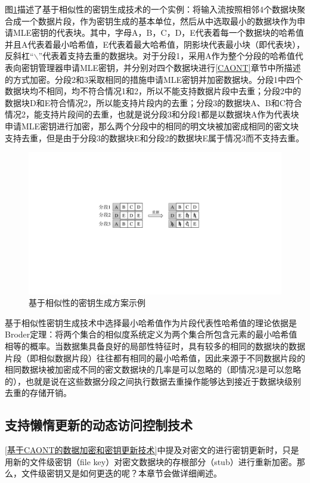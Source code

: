 \documentclass[promaster]{thesis-uestc}
\begin{document}
图\ref{基于相似性的密钥生成方案示例}描述了基于相似性的密钥生成技术的一个实例：将输入流按照相邻4个数据块聚合成一个数据片段，作为密钥生成的基本单位，然后从中选取最小的数据块作为申请MLE密钥的代表块。其中，字母A，B，C，D，E代表着每一个数据块的哈希值并且A代表着最小哈希值，E代表着最大哈希值，阴影块代表最小块（即代表块），反斜杠“$\backslash$”代表着支持去重的数据块。对于分段1，采用A作为整个分段的哈希值代表向密钥管理器申请MLE密钥，并分别对四个数据块进行\ref{CAONT}章节中所描述的方式加密。分段2和3采取相同的措施申请MLE密钥并加密数据块。分段1中四个数据块均不相同，均不符合情况1和2，所以不能支持数据片段中去重；分段2中的数据块D和E符合情况2，所以能支持片段内的去重；分段3的数据块A、B和C符合情况2，能支持片段间的去重，也就是说分段3和分段1都是以数据块A作为代表块申请MLE密钥进行加密，那么两个分段中的相同的明文块被加密成相同的密文块支持去重，但是由于分段3的数据块E和分段2的数据块E属于情况3而不支持去重。
\begin{figure}[htbp]
    \centering
    \includegraphics[width = 0.6\linewidth]{pic/相似性密钥生成方案.pdf}
    \caption{基于相似性的密钥生成方案示例}
    \label{基于相似性的密钥生成方案示例}
\end{figure}

基于相似性密钥生成技术中选择最小哈希值作为片段代表性哈希值的理论依据是Broder定理：将两个集合的相似度系统定义为两个集合所包含元素的最小哈希值相等的概率。当数据集具备良好的局部性特征时，具有较多的相同的数据块的数据片段（即相似数据片段）往往都有相同的最小哈希值，因此来源于不同数据片段的相同数据块被加密成不同的密文数据块的几率是可以忽略的（即情况3是可以忽略的），也就是说在这些数据分段之间执行数据去重操作能够达到接近于数据块级别去重的存储开销。

\subsection{支持懒惰更新的动态访问控制技术}\label{支持懒惰更新的动态访问控制技术}
\ref{基于CAONT的数据加密和密钥更新技术}中提及对密文的进行密钥更新时，只是用新的文件级密钥（file key）对密文数据块的存根部分（stub）进行重新加密。那么，文件级密钥又是如何更迭的呢？本章节会做详细阐述。
\end{document}

